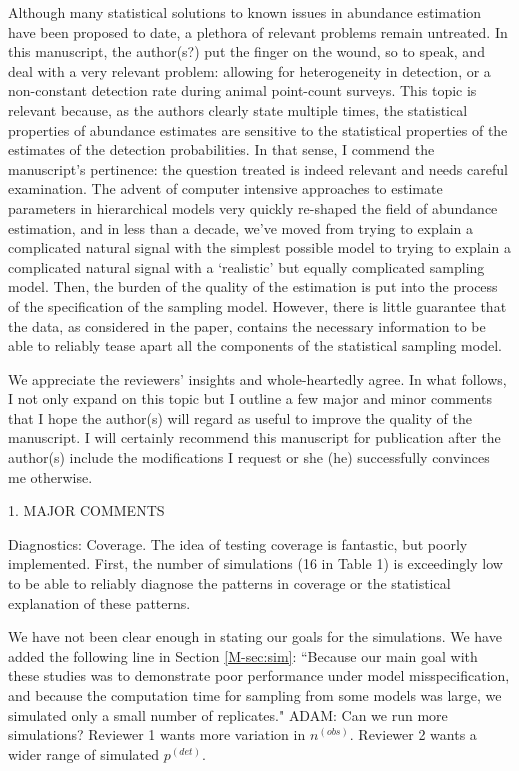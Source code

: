 \documentclass[12pt]{article}
\renewenvironment{quote}  %
              {\list{}{\rightmargin\leftmargin}\normalfont%
               \item\relax}
              {\endlist}
\newcommand{\adam}[1]{{\color{blue} ADAM: #1}}
\newcommand{\pdet}{p^{(det)}}
\begin{document}
Although many statistical solutions to known issues in abundance estimation have been proposed to date, a plethora of relevant problems remain untreated.  In this manuscript, the author(s?) put the finger on the wound, so to speak, and deal with a very relevant problem: allowing for heterogeneity in detection, or a non-constant detection rate during animal point-count surveys.  This topic is relevant because, as the authors clearly state multiple times, the statistical properties of abundance estimates are sensitive to the statistical properties of the estimates of the detection probabilities. In that sense, I commend the manuscript's pertinence: the question treated is indeed relevant and needs careful examination.
The advent of computer intensive approaches to estimate parameters in hierarchical models very quickly re-shaped the field of abundance estimation, and in less than a decade, we've moved from trying to explain a complicated natural signal with the simplest possible model to trying to explain a complicated natural signal with a `realistic' but equally complicated sampling model. Then, the burden of the quality of the estimation is put into the process of the specification of the sampling model. However, there is little guarantee that the data, as considered in the paper, contains the necessary information to be able to reliably tease apart all the components of the statistical sampling model. 
\begin{quote}
We appreciate the reviewers' insights and whole-heartedly agree.
\end{quote}
In what follows, I not only expand on this topic but I outline a few major and minor comments that I hope the author(s) will regard as useful to improve the quality of the manuscript. I will certainly recommend this manuscript for publication after the author(s) include the
modifications I request or she (he) successfully convinces me otherwise.



1. MAJOR COMMENTS


Diagnostics: Coverage. The idea of testing coverage is fantastic, but poorly implemented. First, the number of simulations (16 in Table 1) is exceedingly low to be able to reliably diagnose the patterns in coverage or the statistical explanation of these patterns. 
\begin{quote}
We have not been clear enough in stating our goals for the simulations.
We have added the following line in Section \ref{M-sec:sim}: ``Because our main goal with these studies was to demonstrate poor performance under model misspecification, and because the computation time for sampling from some models was large, we simulated only a small number of replicates."
\adam{Can we run more simulations?  Reviewer 1 wants more variation in $n^{(obs)}$.  Reviewer 2 wants a wider range of simulated $\pdet$.}
\end{quote}
\end{document}
